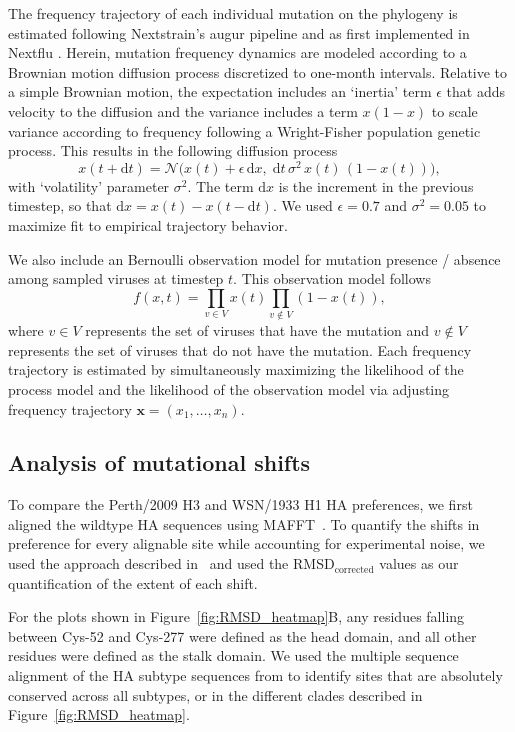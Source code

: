 \documentclass[9pt,twocolumn,twoside]{pnas-new}
\begin{document}
{%
\newcommand{\dx}{\mathrm{d}x}						%
\newcommand{\dy}{\mathrm{d}y}						%
\newcommand{\dt}{\mathrm{d}t}						%
\newcommand{\inertia}{\epsilon}			    %
\newcommand{\normal}{\mathcal{N}}				%

The frequency trajectory of each individual mutation on the phylogeny is estimated following Nextstrain's augur pipeline and as first implemented in Nextflu \cite{neher2015nextflu}.
Herein, mutation frequency dynamics are modeled according to a Brownian motion diffusion process discretized to one-month intervals.
Relative to a simple Brownian motion, the expectation includes an `inertia' term $\inertia$ that adds velocity to the diffusion and the variance includes a term $x(1-x)$ to scale variance according to frequency following a Wright-Fisher population genetic process.
This results in the following diffusion process
\begin{equation}
x(t+\dt) = \normal\big( x(t) + \inertia \, \dx , \; \dt \, \sigma^2 \, x(t) \, (1-x(t)) \big),
\end{equation}
with `volatility' parameter $\sigma^2$.
The term $\dx$ is the increment in the previous timestep, so that $\dx = x(t) - x(t-\dt)$.
We used $\inertia = 0.7$ and $\sigma^2 = 0.05$ to maximize fit to empirical trajectory behavior.

We also include an Bernoulli observation model for mutation presence / absence among sampled viruses at timestep $t$.
This observation model follows
\begin{equation}
f(x,t) = \prod_{v\in V} x(t) \prod_{v\notin V} (1-x(t)),
\end{equation}
where $v\in V$ represents the set of viruses that have the mutation and $v\notin V$ represents the set of viruses that do not have the mutation.
Each frequency trajectory is estimated by simultaneously maximizing the likelihood of the process model and the likelihood of the observation model via adjusting frequency trajectory $\mathbf{x}=(x_1, \ldots, x_n)$.


\subsection*{Analysis of mutational shifts}
To compare the Perth/2009 H3 and WSN/1933 H1 HA preferences, we first aligned the wildtype HA sequences using MAFFT~\cite{katoh2013mafft}.
To quantify the shifts in preference for every alignable site while accounting for experimental noise, we used the approach described in~\cite{haddox2018mapping} and used the RMSD$_{\text{corrected}}$ values as our quantification of the extent of each shift.

For the plots shown in Figure~\ref{fig:RMSD_heatmap}B, any residues falling between Cys-52 and Cys-277 were defined as the head domain, and all other residues were defined as the stalk domain.
We used the multiple sequence alignment of the HA subtype sequences from \cite{doud2018quantifying} to identify sites that are absolutely conserved across all subtypes, or in the different clades described in Figure~\ref{fig:RMSD_heatmap}.

}
\end{document}
